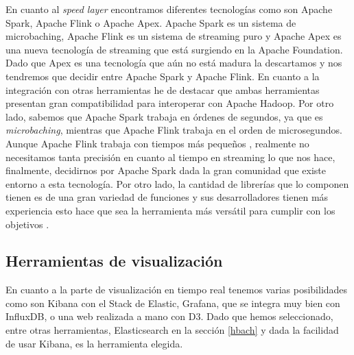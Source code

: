 En cuanto al {\em speed layer} encontramos diferentes tecnologías como
son Apache Spark, Apache Flink o Apache Apex. Apache Spark es un sistema
de microbaching, Apache Flink es un sistema de streaming puro y Apache Apex
es una nueva tecnología de streaming que está surgiendo en la Apache
Foundation. Dado que Apex es una tecnología que aún no está madura la
descartamos y nos tendremos que decidir entre Apache Spark y Apache Flink.
En cuanto a la integración con otras herramientas he de destacar que ambas
herramientas presentan gran compatibilidad para interoperar con Apache Hadoop.
Por otro lado, sabemos que Apache Spark trabaja en órdenes de segundos,
ya que es {\em microbaching}, mientras que Apache Flink trabaja en el orden
de microsegundos. Aunque Apache Flink trabaja con tiempos más pequeños
\cite{Hrr-4}, realmente no necesitamos tanta precisión en cuanto al tiempo
en streaming lo que nos hace, finalmente, decidirnos por Apache Spark
dada la gran comunidad que existe entorno a esta tecnología. Por otro
lado, la cantidad de librerías que lo componen tienen es de una gran variedad
de funciones y sus desarrolladores tienen más experiencia esto hace que sea
la herramienta más versátil para cumplir con los objetivos \cite{Hrr-3}.

\subsection{Herramientas de visualización\label{hvisual}}

En cuanto a la parte de visualización en tiempo real tenemos varias
posibilidades como son Kibana con el Stack de Elastic, Grafana, que
se integra muy bien con InfluxDB, o una web realizada a mano con D3. Dado que
hemos seleccionado, entre otras herramientas, Elasticsearch en la sección
\ref{hbach} y dada la facilidad de usar Kibana, es la herramienta elegida.


